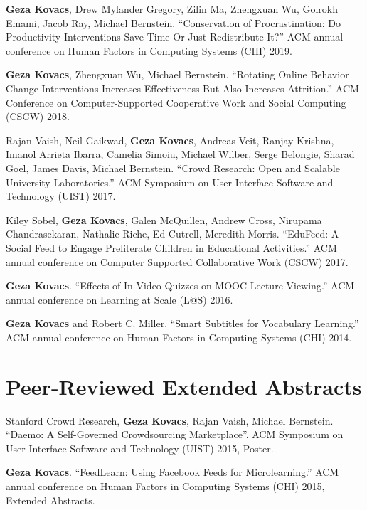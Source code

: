 \documentclass[margin,line]{resume}
\begin{document}
\begin{resume}
\textbf{Geza Kovacs}, Drew Mylander Gregory, Zilin Ma, Zhengxuan Wu, Golrokh Emami, Jacob Ray, Michael Bernstein. ``Conservation of Procrastination: Do Productivity Interventions Save Time Or Just Redistribute It?'' ACM annual conference on Human Factors in Computing Systems (CHI) 2019. %

\textbf{Geza Kovacs}, Zhengxuan Wu, Michael Bernstein. ``Rotating Online Behavior Change Interventions Increases Effectiveness But Also Increases Attrition.'' ACM Conference on Computer-Supported Cooperative Work and Social Computing (CSCW) 2018. %

Rajan Vaish, Neil Gaikwad, \textbf{Geza Kovacs}, Andreas Veit, Ranjay Krishna, Imanol Arrieta Ibarra, Camelia Simoiu, Michael Wilber, Serge Belongie, Sharad Goel, James Davis, Michael Bernstein. ``Crowd Research: Open and Scalable University Laboratories.'' ACM Symposium on User Interface Software and Technology (UIST) 2017. %

Kiley Sobel, \textbf{Geza Kovacs}, Galen McQuillen, Andrew Cross, Nirupama Chandrasekaran, Nathalie Riche, Ed Cutrell, Meredith Morris. ``EduFeed: A Social Feed to Engage Preliterate Children in Educational Activities.'' ACM annual conference on Computer Supported Collaborative Work (CSCW) 2017. %

\textbf{Geza Kovacs}. ``Effects of In-Video Quizzes on MOOC Lecture Viewing.'' ACM annual conference on Learning at Scale (L@S) 2016. %

\textbf{Geza Kovacs} and Robert C. Miller. ``Smart Subtitles for Vocabulary Learning.'' ACM annual conference on Human Factors in Computing Systems (CHI) 2014. %


\section{\mysidestyle Peer-Reviewed Extended Abstracts}

Stanford Crowd Research, \textbf{Geza Kovacs}, Rajan Vaish, Michael Bernstein. ``Daemo: A Self-Governed Crowdsourcing Marketplace''. ACM Symposium on User Interface Software and Technology (UIST) 2015, Poster.

\textbf{Geza Kovacs}. ``FeedLearn: Using Facebook Feeds for Microlearning.'' ACM annual conference on Human Factors in Computing Systems (CHI) 2015, Extended Abstracts. %


\end{resume}
\end{document}
